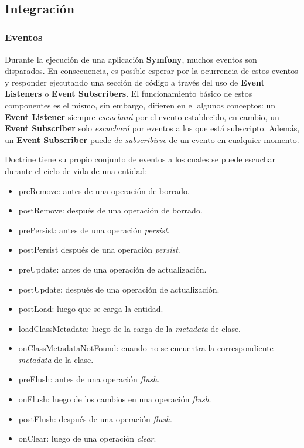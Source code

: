 ~\newpage
\subsection{Integración}

\subsubsection{Eventos}%
\label{ssub:eventos}


Durante la ejecución de una aplicación \textbf{Symfony}, muchos eventos son disparados\@. En consecuencia, es posible esperar por la ocurrencia de estos eventos y responder ejecutando
una sección de código a través del uso de \textbf{Event Listeners} o \textbf{Event Subscribers}\@. El funcionamiento básico de estos componentes es el mismo, sin embargo, difieren en
el algunos conceptos: un \textbf{Event Listener} siempre \textit{escuchará} por el evento establecido, en cambio, un \textbf{Event Subscriber} solo \textit{escuchará} por eventos a los
que está subscripto\@. Además, un \textbf{Event Subscriber} puede \textit{de-subscribirse} de un evento en cualquier momento.


Doctrine tiene su propio conjunto de eventos a los cuales se puede escuchar durante el ciclo de vida de una entidad:

\begin{itemize}
    \item preRemove: antes de una operación de borrado.
    \item postRemove: después de una operación de borrado.
    \item prePersist: antes de una operación \textit{persist}.
    \item postPersist después de una operación \textit{persist}.
    \item preUpdate: antes de una operación de actualización.
    \item postUpdate: después de una operación de actualización.
    \item postLoad: luego que se carga la entidad.
    \item loadClassMetadata: luego de la carga de la \textit{metadata} de clase.
    \item onClassMetadataNotFound: cuando no se encuentra la correspondiente \textit{metadata} de la clase.
    \item preFlush: antes de una operación \textit{flush}.
    \item onFlush: luego de los cambios en una operación \textit{flush}.
    \item postFlush: después de una operación \textit{flush}.
    \item onClear: luego de una operación \textit{clear}.
\end{itemize}

